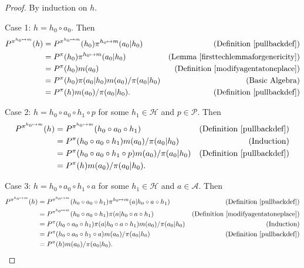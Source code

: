 \documentclass[twoside]{article}
\begin{document}
\begin{proof}
    By induction on $h$.

    Case 1: $h=h_0\circ a_0$. Then
    \begin{align*}
        P^{\pi^{h_0\mapsto m}}(h)
        &= P^{\pi^{h_0\mapsto m}}(h_0)\pi^{h_0\mapsto m}(a_0|h_0)
            &\mbox{(Definition \ref{pullbackdef})}\\
        &= P^\pi(h_0)\pi^{h_0\mapsto m}(a_0|h_0)
            &\mbox{(Lemma \ref{firsttechlemmaforgenericity})}\\
        &= P^\pi(h_0)m(a_0)
            &\mbox{(Definition \ref{modifyagentatoneplace})}\\
        &= P^\pi(h_0)\pi(a_0|h_0)m(a_0)/\pi(a_0|h_0)
            &\mbox{(Basic Algebra)}\\
        &= P^\pi(h)m(a_0)/\pi(a_0|h_0).
            &\mbox{(Definition \ref{pullbackdef})}
    \end{align*}

    Case 2: $h=h_0\circ a_0\circ h_1\circ p$ for some $h_1\in\mathcal H$
        and $p\in\mathcal P$. Then
    \begin{align*}
        P^{\pi^{h_0\mapsto m}}(h)
        &= P^{\pi^{h_0\mapsto m}}(h_0\circ a_0\circ h_1)
            &\mbox{(Definition \ref{pullbackdef})}\\
        &= P^\pi(h_0\circ a_0\circ h_1)m(a_0)/\pi(a_0|h_0)
            &\mbox{(Induction)}\\
        &= P^\pi(h_0\circ a_0\circ h_1\circ p)m(a_0)/\pi(a_0|h_0)
            &\mbox{(Definition \ref{pullbackdef})}\\
        &= P^\pi(h)m(a_0)/\pi(a_0|h_0).
    \end{align*}

    Case 3: $h=h_0\circ a_0\circ h_1\circ a$ for some $h_1\in\mathcal H$ and
        $a\in\mathcal A$. Then
    \begin{align*}
        P^{\pi^{h_0\mapsto m}}(h)
        &= P^{\pi^{h_0\mapsto m}}(h_0\circ a_0\circ h_1)
            \pi^{h_0\mapsto m}(a|h_0\circ a\circ h_1)
            &\mbox{(Definition \ref{pullbackdef})}\\
        &= P^{\pi^{h_0\mapsto m}}(h_0\circ a_0\circ h_1)
            \pi(a|h_0\circ a\circ h_1)
            &\mbox{(Definition \ref{modifyagentatoneplace})}\\
        &= P^\pi(h_0\circ a_0\circ h_1)\pi(a|h_0\circ a\circ h_1)m(a_0)/\pi(a_0|h_0)
            &\mbox{(Induction)}\\
        &= P^\pi(h_0\circ a_0\circ h_1\circ a)m(a_0)/\pi(a_0|h_0)
            &\mbox{(Definition \ref{pullbackdef})}\\
        &= P^\pi(h)m(a_0)/\pi(a_0|h_0).
    \end{align*}
\end{proof}
\end{document}
